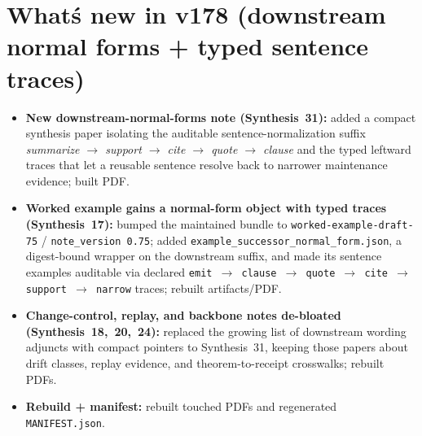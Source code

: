 \documentclass[11pt]{article}
\begin{document}
\section{What\'s new in v178 (downstream normal forms + typed sentence traces)}
\begin{itemize}[leftmargin=*]
\item \textbf{New downstream-normal-forms note (Synthesis~31):} added a compact synthesis paper isolating the auditable sentence-normalization suffix \emph{summarize $\to$ support $\to$ cite $\to$ quote $\to$ clause} and the typed leftward traces that let a reusable sentence resolve back to narrower maintenance evidence; built PDF.
\item \textbf{Worked example gains a normal-form object with typed traces (Synthesis~17):} bumped the maintained bundle to \texttt{worked-example-draft-75} / \texttt{note\_version 0.75}; added \texttt{example\_successor\_normal\_form.json}, a digest-bound wrapper on the downstream suffix, and made its sentence examples auditable via declared \texttt{emit $\to$ clause $\to$ quote $\to$ cite $\to$ support $\to$ narrow} traces; rebuilt artifacts/PDF.
\item \textbf{Change-control, replay, and backbone notes de-bloated (Synthesis~18,~20,~24):} replaced the growing list of downstream wording adjuncts with compact pointers to Synthesis~31, keeping those papers about drift classes, replay evidence, and theorem-to-receipt crosswalks; rebuilt PDFs.
\item \textbf{Rebuild + manifest:} rebuilt touched PDFs and regenerated \texttt{MANIFEST.json}.
\end{itemize}
\end{document}
